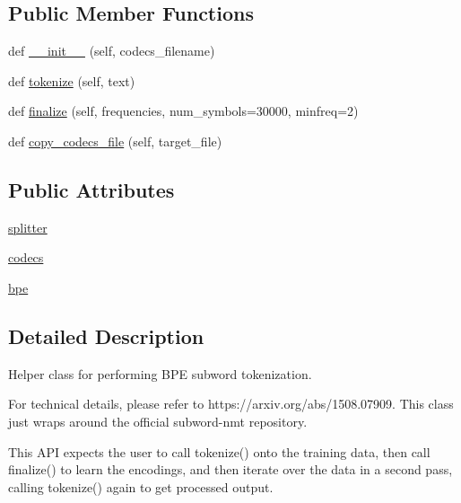 \subsection*{Public Member Functions}
\begin{DoxyCompactItemize}
\item 
def \hyperlink{classparlai_1_1core_1_1dict_1_1__BPEHelper_a449da91d98a6bb75bc374782cf9f7016}{\+\_\+\+\_\+init\+\_\+\+\_\+} (self, codecs\+\_\+filename)
\item 
def \hyperlink{classparlai_1_1core_1_1dict_1_1__BPEHelper_a1492c4bca01a00536eef0e3cc15f134b}{tokenize} (self, text)
\item 
def \hyperlink{classparlai_1_1core_1_1dict_1_1__BPEHelper_ae93cf51522695ac3f45fc19eee94f64c}{finalize} (self, frequencies, num\+\_\+symbols=30000, minfreq=2)
\item 
def \hyperlink{classparlai_1_1core_1_1dict_1_1__BPEHelper_a712c4482ea0dc907543effce64bd8145}{copy\+\_\+codecs\+\_\+file} (self, target\+\_\+file)
\end{DoxyCompactItemize}
\subsection*{Public Attributes}
\begin{DoxyCompactItemize}
\item 
\hyperlink{classparlai_1_1core_1_1dict_1_1__BPEHelper_a4982da2af63c5f2e4ca0e17b1693659c}{splitter}
\item 
\hyperlink{classparlai_1_1core_1_1dict_1_1__BPEHelper_a03ab8d245394a2916d8d73cfe521aebe}{codecs}
\item 
\hyperlink{classparlai_1_1core_1_1dict_1_1__BPEHelper_af99fd825694f985095fd9ac55fcd2ba3}{bpe}
\end{DoxyCompactItemize}


\subsection{Detailed Description}
\begin{DoxyVerb}Helper class for performing BPE subword tokenization.

For technical details, please refer to https://arxiv.org/abs/1508.07909.
This class just wraps around the official subword-nmt repository.

This API expects the user to call tokenize() onto the training data,
then call finalize() to learn the encodings, and then iterate over the data
in a second pass, calling tokenize() again to get processed output.
\end{DoxyVerb}
 

